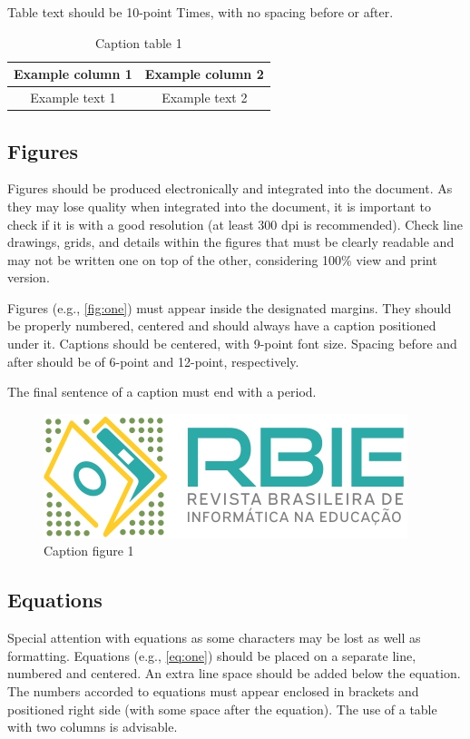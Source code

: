 \documentclass[english, spanish, brazilian]{RBIEarticle} %
\begin{document}
Table text should be 10-point Times, with no spacing before or after.

\begin{table}[h]
	\caption{Caption table 1}
	\label{tab:one}
	\centering\footnotesize%
	\begin{tabular}{|c|c|}
		\hline
		\rowcolor{gray} \textbf{Example column 1} & \textbf{Example column 2}\\
		\hline
		Example text 1 & Example text 2\\
		\hline
	\end{tabular}
\end{table}


\subsection{Figures}
Figures should be produced electronically and integrated into the document. As they may lose quality when integrated into the document, it is important to check if it is with a good resolution (at least 300 dpi is recommended). Check line drawings, grids, and details within the figures that must be clearly readable and may not be written one on top of the other, considering 100\% view and print version.

Figures (e.g., \autoref{fig:one}) must appear inside the designated margins. They should be properly numbered, centered and should always have a caption positioned under it. Captions should be centered, with 9-point font size. Spacing before and after should be of 6-point and 12-point, respectively.

The final sentence of a caption must end with a period. 

\begin{figure}[h]
	\centerline{\includegraphics[scale=0.25]{newlogo.png}}
	\caption{Caption figure 1}
	\label{fig:one}
\end{figure}


\subsection{Equations}
Special attention with equations as some characters may be lost as well as formatting. Equations (e.g., \autoref{eq:one}) should be placed on a separate line, numbered and centered. An extra line space should be added below the equation. The numbers accorded to equations must appear enclosed in brackets and positioned right side (with some space after the equation).
The use of a table with two columns is advisable.
\end{document}
